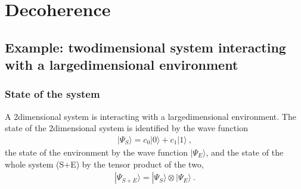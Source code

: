 \documentclass[letterpaper,10pt,english]{jupyterBook}
\begin{document}
\sphinxstepscope


\chapter{Decoherence}
\label{\detokenize{ch/quantum-mechanics/decoherence:decoherence}}\label{\detokenize{ch/quantum-mechanics/decoherence:quantum-mechanics-decoherence}}\label{\detokenize{ch/quantum-mechanics/decoherence::doc}}

\section{Example: two\sphinxhyphen{}dimensional system interacting with a large\sphinxhyphen{}dimensional environment}
\label{\detokenize{ch/quantum-mechanics/decoherence:example-two-dimensional-system-interacting-with-a-large-dimensional-environment}}\label{\detokenize{ch/quantum-mechanics/decoherence:quantum-mechanics-decoherence-example}}

\subsection{State of the system}
\label{\detokenize{ch/quantum-mechanics/decoherence:state-of-the-system}}\label{\detokenize{ch/quantum-mechanics/decoherence:quantum-mechanics-decoherence-example-state}}
\sphinxAtStartPar
A 2\sphinxhyphen{}dimensional system is interacting with a large\sphinxhyphen{}dimensional environment. The state of the 2\sphinxhyphen{}dimensional system is identified by the wave function
\begin{equation*}
\begin{split}| \Psi_S \rangle = c_0 | 0 \rangle + c_1 | 1 \rangle \ ,\end{split}
\end{equation*}
\sphinxAtStartPar
the state of the environment by the wave function \(| \Psi_E \rangle\), and the state of the whole system (S+E) by the tensor product of the two,
\begin{equation*}
\begin{split}| \Psi_{S+E} \rangle = | \Psi_S \rangle \otimes | \Psi_E \rangle \ .\end{split}
\end{equation*}
\end{document}
